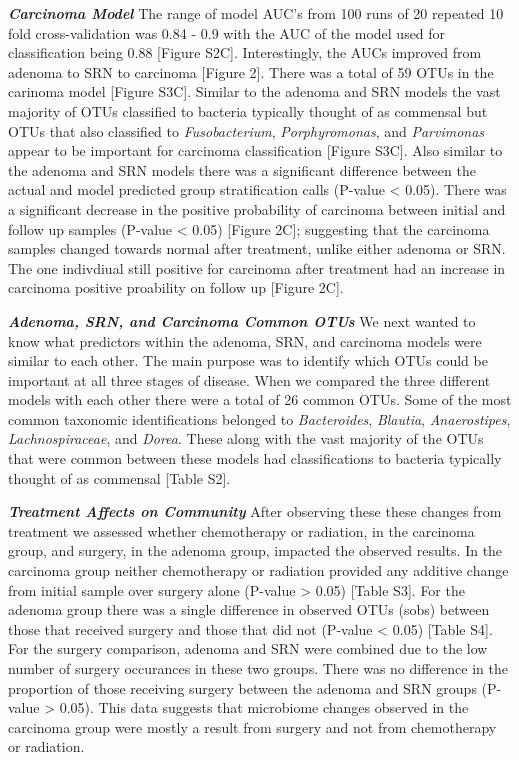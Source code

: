 \documentclass[12pt,]{article}
\begin{document}
\textbf{\emph{Carcinoma Model}} The range of model AUC's from 100 runs
of 20 repeated 10 fold cross-validation was 0.84 - 0.9 with the AUC of
the model used for classification being 0.88 {[}Figure S2C{]}.
Interestingly, the AUCs improved from adenoma to SRN to carcinoma
{[}Figure 2{]}. There was a total of 59 OTUs in the carinoma model
{[}Figure S3C{]}. Similar to the adenoma and SRN models the vast
majority of OTUs classified to bacteria typically thought of as
commensal but OTUs that also classified to \emph{Fusobacterium},
\emph{Porphyromonas}, and \emph{Parvimonas} appear to be important for
carcinoma classification {[}Figure S3C{]}. Also similar to the adenoma
and SRN models there was a significant difference between the actual and
model predicted group stratification calls (P-value \textless{} 0.05).
There was a significant decrease in the positive probability of
carcinoma between initial and follow up samples (P-value \textless{}
0.05) {[}Figure 2C{]}; suggesting that the carcinoma samples changed
towards normal after treatment, unlike either adenoma or SRN. The one
indivdiual still positive for carcinoma after treatment had an increase
in carcinoma positive proability on follow up {[}Figure 2C{]}.

\textbf{\emph{Adenoma, SRN, and Carcinoma Common OTUs}} We next wanted
to know what predictors within the adenoma, SRN, and carcinoma models
were similar to each other. The main purpose was to identify which OTUs
could be important at all three stages of disease. When we compared the
three different models with each other there were a total of 26 common
OTUs. Some of the most common taxonomic identifications belonged to
\emph{Bacteroides}, \emph{Blautia}, \emph{Anaerostipes},
\emph{Lachnospiraceae}, and \emph{Dorea}. These along with the vast
majority of the OTUs that were common between these models had
classifications to bacteria typically thought of as commensal {[}Table
S2{]}.

\textbf{\emph{Treatment Affects on Community}} After observing these
these changes from treatment we assessed whether chemotherapy or
radiation, in the carcinoma group, and surgery, in the adenoma group,
impacted the observed results. In the carcinoma group neither
chemotherapy or radiation provided any additive change from initial
sample over surgery alone (P-value \textgreater{} 0.05) {[}Table S3{]}.
For the adenoma group there was a single difference in observed OTUs
(sobs) between those that received surgery and those that did not
(P-value \textless{} 0.05) {[}Table S4{]}. For the surgery comparison,
adenoma and SRN were combined due to the low number of surgery
occurances in these two groups. There was no difference in the
proportion of those receiving surgery between the adenoma and SRN groups
(P-value \textgreater{} 0.05). This data suggests that microbiome
changes observed in the carcinoma group were mostly a result from
surgery and not from chemotherapy or radiation.
\end{document}
